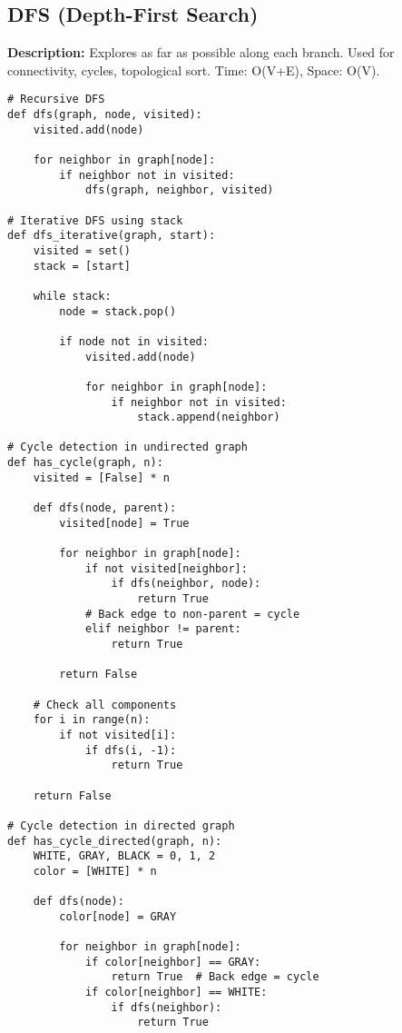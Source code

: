 \subsection{DFS (Depth-First Search)}
\textbf{Description:} Explores as far as possible along each branch. Used for connectivity, cycles, topological sort. Time: O(V+E), Space: O(V).

\begin{lstlisting}
# Recursive DFS
def dfs(graph, node, visited):
    visited.add(node)
    
    for neighbor in graph[node]:
        if neighbor not in visited:
            dfs(graph, neighbor, visited)

# Iterative DFS using stack
def dfs_iterative(graph, start):
    visited = set()
    stack = [start]
    
    while stack:
        node = stack.pop()
        
        if node not in visited:
            visited.add(node)
            
            for neighbor in graph[node]:
                if neighbor not in visited:
                    stack.append(neighbor)

# Cycle detection in undirected graph
def has_cycle(graph, n):
    visited = [False] * n
    
    def dfs(node, parent):
        visited[node] = True
        
        for neighbor in graph[node]:
            if not visited[neighbor]:
                if dfs(neighbor, node):
                    return True
            # Back edge to non-parent = cycle
            elif neighbor != parent:
                return True
        
        return False
    
    # Check all components
    for i in range(n):
        if not visited[i]:
            if dfs(i, -1):
                return True
    
    return False

# Cycle detection in directed graph
def has_cycle_directed(graph, n):
    WHITE, GRAY, BLACK = 0, 1, 2
    color = [WHITE] * n
    
    def dfs(node):
        color[node] = GRAY
        
        for neighbor in graph[node]:
            if color[neighbor] == GRAY:
                return True  # Back edge = cycle
            if color[neighbor] == WHITE:
                if dfs(neighbor):
                    return True
        

\end{lstlisting}
